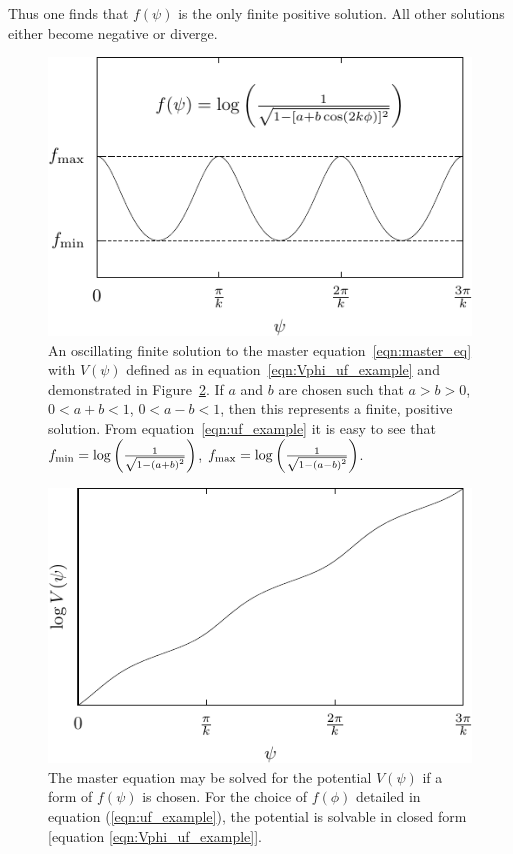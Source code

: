 Thus one finds that $f(\psi)$ is the only finite positive solution.  All other solutions either become negative or diverge.





%
\begin{figure}[ht]
  \centering
  \includegraphics[width=\textwidth]{chapter_kinetic_dominance/figures/uf}
  \caption{An oscillating finite solution to the master equation~\protect\eqref{eqn:master_eq} with $V(\psi)$ defined as in equation~\protect\eqref{eqn:Vphi_uf_example} and demonstrated in Figure~\protect\ref{fig:figure_ospot}. If $a$ and $b$ are chosen such that $a>b>0$, $0<a+b<1$, $0<a-b<1$, then this represents a finite, positive solution.  From equation~\protect\eqref{eqn:uf_example} it is easy to see that $f_\mathrm{min} = \log\left(\frac{1}{\sqrt{1-{(a+b)}^2}}\right)$, $f_\mathrm{max}=\log\left(\frac{1}{\sqrt{1-{(a-b)}^2}}\right)$.\label{fig:figure_uf}}
\end{figure}
%

%
\begin{figure}[ht]
  \centering
  \includegraphics[width=\textwidth]{chapter_kinetic_dominance/figures/ospot}
  \caption{The master equation may be solved for the potential $V(\psi)$ if a form of $f(\psi)$ is chosen. For the choice of $f(\phi)$ detailed in equation (\protect\ref{eqn:uf_example}), the potential is solvable in closed form [equation \protect\ref{eqn:Vphi_uf_example}].\label{fig:figure_ospot}}
\end{figure}
%





